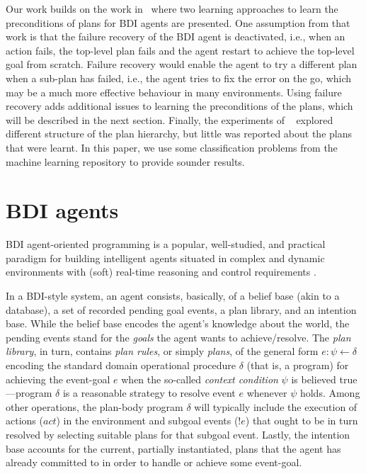 \documentclass{article}
\begin{document}
Our work builds on the work in~\cite{Singh10:Learning} where two learning approaches to learn the preconditions of plans for BDI agents are presented.  One assumption from that work is that the failure recovery of the BDI agent is deactivated, i.e., when an action fails, the top-level plan fails and the agent restart to achieve the top-level goal from scratch. Failure recovery would enable the agent to try a different plan when a sub-plan has failed, i.e., the agent tries to fix the error on the go, which may be a much more effective behaviour in many environments. Using failure recovery adds additional issues to learning the preconditions of the plans, which will be described in the next section. Finally, the experiments of ~\cite{Singh10:Learning} explored different structure of the plan hierarchy, but little was reported about the plans that were learnt. In this paper, we use some classification problems from the machine learning repository to provide sounder results.


\section{BDI agents}

BDI agent-oriented programming is a popular, well-studied, and practical paradigm
for building intelligent agents situated in complex and dynamic environments with
(soft) real-time reasoning and control requirements
\cite{Georgeff89-PRS,Benfield:AAMAS06}.

In a BDI-style system, an agent consists, basically, of a belief base (akin to a
database), a set of recorded pending goal events, a plan library, and an
intention base. While the belief base encodes the agent's knowledge about the
world, the pending events stand for the \emph{goals} the agent wants to
achieve/resolve.
The \textit{plan library}, in turn, contains \emph{plan rules}, or simply
\emph{plans}, of the general form $e: \psi \leftarrow \delta$ encoding the
standard domain operational procedure $\delta$ (that is, a program) for achieving
the event-goal $e$ when the so-called \textit{context condition} $\psi$ is
believed true---program $\delta$ is a reasonable strategy to resolve event $e$
whenever $\psi$ holds. Among other operations, the plan-body program $\delta$
will typically include the execution of actions ($act$) in the environment and
subgoal events ($!e$) that ought to be in turn resolved by selecting suitable
plans for that subgoal event. Lastly, the intention base accounts for the
current, partially instantiated, plans that the agent has already committed to in
order to handle or achieve some event-goal.
\end{document}
